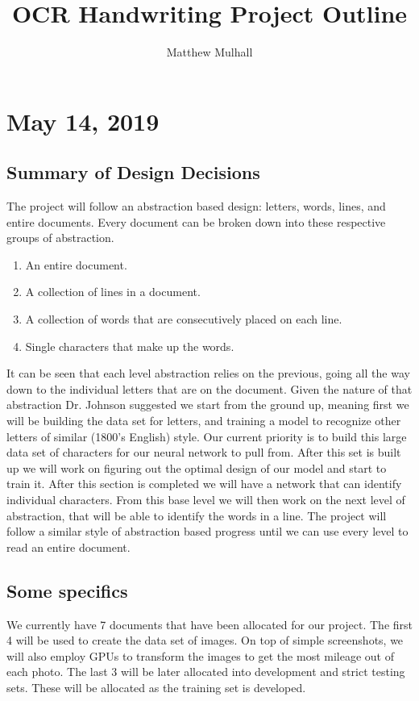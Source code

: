 \documentclass[12pt]{article} %
\title{OCR Handwriting Project Outline}
\author{Matthew Mulhall}
\affil{matthew.l.mulhall@uconn.edu}
\begin{document}
\maketitle

\section{May 14, 2019}
\subsection{Summary of Design Decisions}

The project will follow an abstraction based design: letters, words, lines, and entire documents. Every document can be broken down into these respective groups of abstraction.

\begin{enumerate}[label = (\roman*)]
\item An entire document.
\item A collection of lines in a document.
\item A collection of words that are consecutively placed on each line.
\item Single characters that make up the words.
\end{enumerate}
It can be seen that each level abstraction relies on the previous, going all the way down to the individual letters that are on the document. Given the nature of that abstraction Dr. Johnson suggested we start from the ground up, meaning first we will be building the data set for letters, and training a model to recognize other letters of similar (1800's English) style. Our current priority is to build this large data set of characters for our neural network to pull from. After this set is built up we will work on figuring out the optimal design of our model and start to train it. After this section is completed we will have a network that can identify individual characters. From this base level we will then work on the next level of abstraction, that will be able to identify the words in a line. The project will follow a similar style of abstraction based progress until we can use every level to read an entire document.

\subsection{Some specifics}
We currently have 7 documents that have been allocated for our project. The first 4 will be used to create the data set of images. On top of simple screenshots, we will also employ GPUs to transform the images to get the most mileage out of each photo. The last 3 will be later allocated into development and strict testing sets. These will be allocated as the training set is developed.
\end{document}
